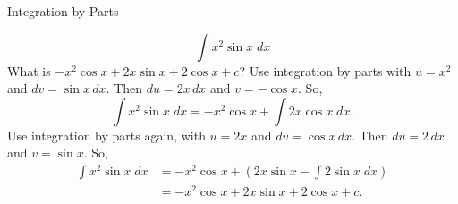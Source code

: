 \documentclass{article}
\begin{document}
\begin{category}{Integration by Parts}
  \begin{clue}
    \[ \int x^{2} \sin x \; dx \]
  \response
    What is $-x^{2} \cos x + 2x \sin x + 2 \cos x + c$?
  \solution
    Use integration by parts with $u=x^{2}$ and $dv=\sin x\,dx.$ Then $du=2x\,dx$ and $v=-\cos x.$ So,
    \[
    \int x^{2} \sin x \; dx = -x^{2} \cos x + \int 2x \cos x \; dx.
    \]
    Use integration by parts again, with $u=2x$ and $dv=\cos x\,dx.$ Then $du=2\,dx$ and $v=\sin x.$ So,
    \begin{align*}
    \int x^{2} \sin x \; dx
    &= -x^{2} \cos x + \left( 2x \sin x - \int 2 \sin x \; dx \right) \\
    &= -x^{2} \cos x + 2x \sin x + 2 \cos x + c.
    \end{align*}
  \end{clue}

\end{category}
\end{document}
